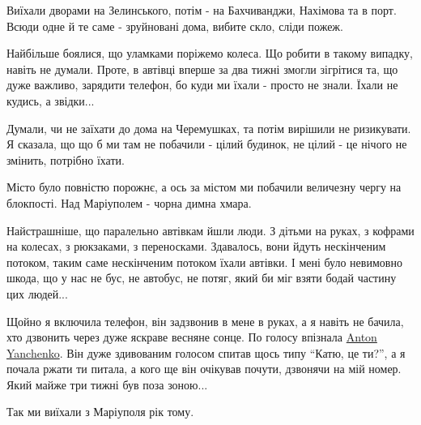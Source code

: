 Виїхали дворами на Зелинського, потім - на Бахчиванджи, Нахімова та в порт.
Всюди одне й те саме - зруйновані дома, вибите скло, сліди пожеж. 

Найбільше боялися, що уламками поріжемо колеса. Що робити в такому випадку,
навіть не думали. Проте, в автівці вперше за два тижні змогли зігрітися та, що
дуже важливо, зарядити телефон, бо куди ми їхали - просто не знали. Їхали не
кудись, а звідки...

Думали, чи не заїхати до дома на Черемушках, та потім вирішили не ризикувати. Я
сказала, що що б ми там не побачили - цілий будинок, не цілий - це нічого не
змінить, потрібно їхати. 

Місто було повністю порожнє, а ось за містом ми побачили величезну чергу на
блокпості. Над Маріуполем - чорна димна хмара. 

Найстрашніше, що паралельно автівкам йшли люди. З дітьми на руках, з кофрами на
колесах, з рюкзаками, з переносками. Здавалось, вони йдуть нескінченим потоком,
таким саме нескінченим потоком їхали автівки. І мені було невимовно шкода, що у
нас не бус, не автобус, не потяг, який би міг взяти бодай частину цих людей... 

Щойно я включила телефон, він задзвонив в мене в руках, а я навіть не бачила,
хто дзвонить через дуже яскраве весняне сонце. По голосу впізнала
\href{https://www.facebook.com/anton.ianchenko}{Anton Yanchenko}. Він дуже
здивованим голосом спитав щось типу \enquote{Катю, це ти?}, а я почала ржати ти
питала, а кого ще він очікував почути, дзвонячи на мій номер.  Який майже три
тижні був поза зоною... 

Так ми виїхали з Маріуполя рік тому.


